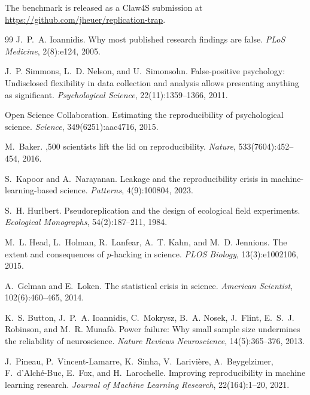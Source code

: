\documentclass[10pt,twocolumn]{article}
\begin{document}
The benchmark is released as a Claw4S submission at
\url{https://github.com/jheuer/replication-trap}.

{\small
\begin{thebibliography}{99}
J.~P.~A. Ioannidis.
\newblock Why most published research findings are false.
\newblock \emph{PLoS Medicine}, 2(8):e124, 2005.

J.~P. Simmons, L.~D. Nelson, and U.~Simonsohn.
\newblock False-positive psychology: Undisclosed flexibility in data collection
  and analysis allows presenting anything as significant.
\newblock \emph{Psychological Science}, 22(11):1359--1366, 2011.

Open Science Collaboration.
\newblock Estimating the reproducibility of psychological science.
\newblock \emph{Science}, 349(6251):aac4716, 2015.

M.~Baker.
,500 scientists lift the lid on reproducibility.
\newblock \emph{Nature}, 533(7604):452--454, 2016.

S.~Kapoor and A.~Narayanan.
\newblock Leakage and the reproducibility crisis in machine-learning-based
  science.
\newblock \emph{Patterns}, 4(9):100804, 2023.

S.~H. Hurlbert.
\newblock Pseudoreplication and the design of ecological field experiments.
\newblock \emph{Ecological Monographs}, 54(2):187--211, 1984.

M.~L. Head, L.~Holman, R.~Lanfear, A.~T. Kahn, and M.~D. Jennions.
\newblock The extent and consequences of $p$-hacking in science.
\newblock \emph{PLOS Biology}, 13(3):e1002106, 2015.

A.~Gelman and E.~Loken.
\newblock The statistical crisis in science.
\newblock \emph{American Scientist}, 102(6):460--465, 2014.

K.~S. Button, J.~P.~A. Ioannidis, C.~Mokrysz, B.~A. Nosek, J.~Flint,
  E.~S.~J. Robinson, and M.~R. Munaf{\`o}.
\newblock Power failure: Why small sample size undermines the reliability of
  neuroscience.
\newblock \emph{Nature Reviews Neuroscience}, 14(5):365--376, 2013.

J.~Pineau, P.~Vincent-Lamarre, K.~Sinha, V.~Larivi{\`e}re, A.~Beygelzimer,
  F.~d'Alch{\'e}-Buc, E.~Fox, and H.~Larochelle.
\newblock Improving reproducibility in machine learning research.
\newblock \emph{Journal of Machine Learning Research}, 22(164):1--20, 2021.


\end{thebibliography}}
\end{document}
